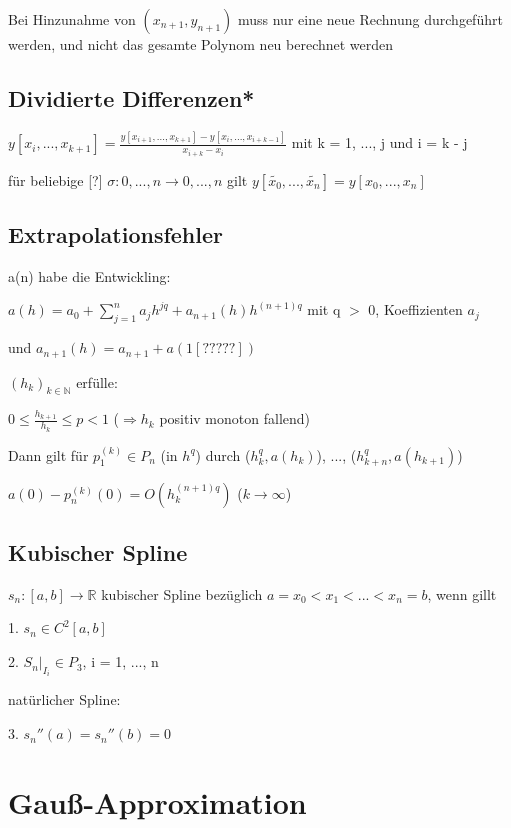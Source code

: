 \documentclass[12pt,a4paper]{article} %
\newcommand*\tab[1][1cm]{\hspace*{#1}}
\begin{document}
	Bei Hinzunahme von $(x_{n + 1}, y_{n + 1})$ muss nur eine neue Rechnung durchgeführt werden, und nicht das gesamte Polynom neu berechnet werden
	
	\subsection{Dividierte Differenzen*}
	
	$y[x_i, ..., x_{k + 1}] = \frac{y[x_{i + 1}, ..., x_{k + 1}] - y[x_i, ..., x_{i + k - 1}]}{x_{i + k} - x_i}$ mit k = 1, ..., j und i = k - j
	
	für beliebige [?] $\sigma:{0, ..., n} \rightarrow {0, ..., n}$ gilt $y[\tilde{x_0}, ..., \tilde{x_n}] = y[x_0, ..., x_n]$
	
	\subsection{Extrapolationsfehler}
	
	a(n) habe die Entwickling:
	
	$a(h) = a_0 + \sum\limits_{j = 1}^{n}a_jh^{jq} + a_{n + 1}(h)h^{(n+1)q}$ \tab mit q $>$ 0,
	Koeffizienten $a_j$ 
	
	und $a_{n + 1}(h) = a_{n + 1} + a(1[?????])$
	
	$(h_k)_{k \in \mathbb{N}}$ erfülle:
	
	$0 \le \frac{h_{k + 1}}{h_k} \le p < 1$ ($\Rightarrow h_k$ positiv monoton fallend)
	
	Dann gilt für $p_1^{(k)} \in P_n$ (in $h^q$) durch ($h_k^q, a(h_k)$), ..., ($h_{k +n}^q, a(h_{k + 1})$)
	
	$a(0) - p_n^{(k)}(0) = O(h_k^{(n + 1)q})$ \tab ($k \rightarrow \infty$)
	
	\subsection{Kubischer Spline}
	
	$s_n: [a, b] \rightarrow \mathbb{R}$ kubischer Spline bezüglich $a = x_0 < x_1 < ... < x_n = b$, wenn gillt
	
	1. $s_n \in C^2[a, b]$
	
	2. $S_n|_{I_i} \in P_3$, i = 1, ..., n
	
	natürlicher Spline:
	
	3. $s_n''(a) = s_n''(b) = 0$
	
	\section{Gauß-Approximation}
	
\end{document}
